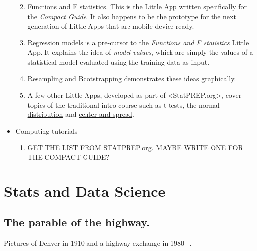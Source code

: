 \documentclass[]{book}
\providecommand{\tightlist}{%
  \setlength{\itemsep}{0pt}\setlength{\parskip}{0pt}}
\begin{document}
\begin{itemize}
  \begin{enumerate}
  \def\labelenumi{\arabic{enumi}.}
  \tightlist
  \item
    \href{http://dtkaplan.shinyapps.io/LittleAppMockup}{Functions and F statistics}. This is the Little App written specifically for the \emph{Compact Guide}. It also happens to be the prototype for the next generation of Little Apps that are mobile-device ready.
  \item
    \href{https://dtkaplan.shinyapps.io/LA_linear_regression/}{Regression models} is a pre-cursor to the \emph{Functions and F statistics} Little App. It explains the idea of \emph{model values}, which are simply the values of a statistical model evaluated using the training data as input.
  \item
    \href{https://dtkaplan.shinyapps.io/LA_bootstrap/}{Resampling and Bootstrapping} demonstrates these ideas graphically.
  \item
    A few other Little Apps, developed as part of \textless{}StatPREP.org\textgreater{}, cover topics of the traditional intro course such as \href{https://dtkaplan.shinyapps.io/LA_t_test/}{t-tests}, the \href{https://dtkaplan.shinyapps.io/LA_rare_and_common/}{normal distribution} and \href{https://dtkaplan.shinyapps.io/LA_center_spread/}{center and spread}.
  \end{enumerate}
\item
  Computing tutorials

  \begin{enumerate}
  \def\labelenumi{\arabic{enumi}.}
  \tightlist
  \item
    GET THE LIST FROM STATPREP.org. MAYBE WRITE ONE FOR THE COMPACT GUIDE?
  \end{enumerate}
\end{itemize}

\hypertarget{stats-and-data-science}{%
\chapter{Stats and Data Science}\label{stats-and-data-science}}

\hypertarget{the-parable-of-the-highway.}{%
\section{The parable of the highway.}\label{the-parable-of-the-highway.}}

Pictures of Denver in 1910 and a highway exchange in 1980+.
\end{document}
